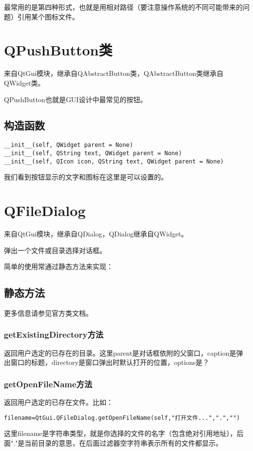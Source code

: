 \documentclass[12pt,oneside]{book}
\begin{document}
\begin{common-format}
最常用的是第四种形式，也就是用相对路径（要注意操作系统的不同可能带来的问题）引用某个图标文件。


\section{QPushButton类}
来自QtGui模块，继承自QAbstractButton类，QAbstractButton类继承自QWidget类。

QPushButton也就是GUI设计中最常见的按钮。

\subsection{构造函数}
\begin{Verbatim}
__init__(self, QWidget parent = None)
__init__(self, QString text, QWidget parent = None)
__init__(self, QIcon icon, QString text, QWidget parent = None)
\end{Verbatim}
我们看到按钮显示的文字和图标在这里是可以设置的。


\section{QFileDialog}
来自QtGui模块，继承自QDialog，QDialog继承自QWidget。

弹出一个文件或目录选择对话框。

简单的使用常通过静态方法来实现：
\subsection{静态方法}
更多信息请参见官方类文档。

\subsubsection{getExistingDirectory方法}
返回用户选定的已存在的目录。这里parent是对话框依附的父窗口，caption是弹出窗口的标题，directory是窗口弹出时默认打开的位置，options是？

\subsubsection{getOpenFileName方法}
返回用户选定的已存在文件。比如：
\begin{Verbatim}
filename=QtGui.QFileDialog.getOpenFileName(self,"打开文件...",".","")
\end{Verbatim}
这里filename是字符串类型，就是你选择的文件的名字（包含绝对引用地址），后面"."是当前目录的意思，在后面过滤器空字符串表示所有的文件都显示。



\end{common-format}
\end{document}
